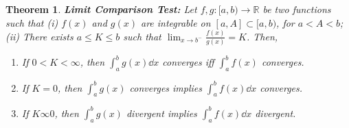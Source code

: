 \documentclass[]{article}
\newcommand{\R}{\mathbb{R}}
\newcommand{\st}{\ : \ }
\newtheorem{theorem}{Theorem}
\begin{document}
\begin{theorem}\label{thm:limit_comp_test}
    \textbf{Limit Comparison Test:}
    Let $f,g:[a,b) \to \R$ be two functions such that 
    (i) $f(x)$ and $g(x)$ are integrable on $[a,A]\subset[a,b)$, for $a<A<b$;
    (ii) There exists $a \leq K \leq b$ such that $\lim_{x\to b^{-}} \frac{f(x)}{g(x)} = K$.
    Then,\begin{enumerate}
        \item If $0< K < \infty$, then $\int_a^b g(x) \dd{x}$ converges iff $\int_a^b f(x)$ converges.
        \item If $K = 0$, then $\int_a^b g(x)$ converges implies $\int_a^b f(x) \dd{x}$ converges.
        \item If $K \infty 0$, then $\int_a^b g(x)$ divergent implies $\int_a^b f(x) \dd{x}$ divergent.
    \end{enumerate}
\end{theorem}

\end{document}
